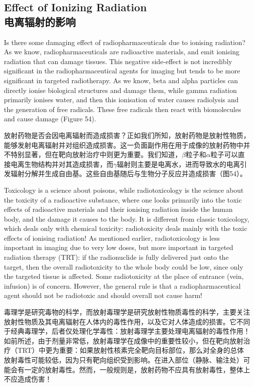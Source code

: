 \documentclass[dvipsnames, svgnames,a4paper,11pt]{article}
\begin{document}
\subsection{Effect of Ionizing Radiation\\电离辐射的影响}
Is there some damaging effect of radiopharmaceuticals due to ionising radiation? As we know, radiopharmaceuticals are radioactive materials, and emit ionising radiation that can damage tissues. This negative side-effect is not incredibly significant in the radiopharmaceutical agents for imaging but tends to be more significant in targeted radiotherapy. As we know, beta and alpha particles can directly ionise biological structures and damage them, while gamma radiation primarily ionises water, and then this ionisation of water causes radiolysis and the generation of free radicals. These free radicals then react with biomolecules and cause damage (Figure 54).

放射药物是否会因电离辐射而造成损害？正如我们所知，放射药物是放射性物质，能够发射电离辐射并对组织造成损害。这一负面副作用在用于成像的放射药物中并不特别显著，但在靶向放射治疗中则更为重要。我们知道，$\beta$粒子和$\alpha$粒子可以直接电离生物结构并对其造成损害，而$\gamma$辐射则主要是电离水，进而导致水的电离引发辐射分解并生成自由基。这些自由基随后与生物分子反应并造成损害（图54）。

Toxicology is a science about poisons, while radiotoxicology is the science about the toxicity of a radioactive substance, where one looks primarily into the toxic effects of radioactive materials and their ionising radiation inside the human body, and the damage it causes to the body. It is different from classic toxicology, which deals only with chemical toxicity: radiotoxicity deals mainly with the toxic effects of ionising radiation! As mentioned earlier, radiotoxicology is less important in imaging due to very low doses, but more important in targeted radiation therapy (TRT): if the radionuclide is fully delivered just onto the target, then the overall radiotoxicity to the whole body could be low, since only the targeted tissue is affected. Some radiotoxicity at the place of entrance (vein, infusion) is of concern. However, the general rule is that a radiopharmaceutical agent should not be radiotoxic and should overall not cause harm!

毒理学是研究毒物的科学，而放射毒理学是研究放射性物质毒性的科学，主要关注放射性物质及其电离辐射在人体内的毒性作用，以及它对人体造成的损害。它不同于经典毒理学，后者仅处理化学毒性：放射毒理学主要处理电离辐射的毒性作用！如前所述，由于剂量非常低，放射毒理学在成像中的重要性较小，但在靶向放射治疗（TRT）中更为重要：如果放射性核素完全靶向目标部位，那么对全身的总体放射毒性可能较低，因为只有靶向组织受到影响。在进入部位（静脉、输注处）可能会有一定的放射毒性。然而，一般规则是，放射药物不应具有放射毒性，整体上不应造成伤害！
\end{document}
